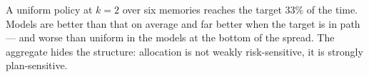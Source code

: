 \documentclass{article}
\begin{document}
A uniform policy at $k{=}2$ over six memories reaches the target 33\% of the
time. Models are better than that on average and far better when the target is
in path --- and worse than uniform in the models at the bottom of the spread.
The aggregate hides the structure: allocation is not weakly risk-sensitive, it
is strongly plan-sensitive.









\end{document}
